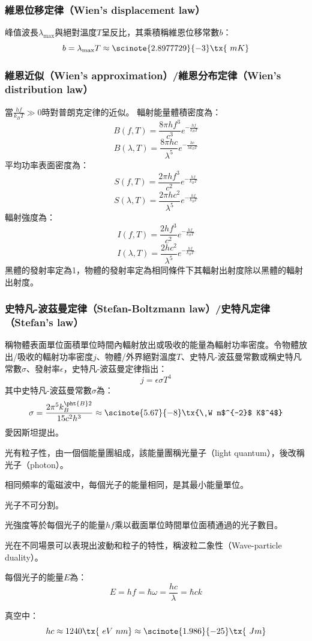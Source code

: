 \documentclass[a4paper,12pt]{article}
\begin{document}
\subsubsection{維恩位移定律（Wien's displacement law）}
峰值波長$\lambda_{\max}$與絕對溫度$T$呈反比，其乘積稱維恩位移常數$b$：
\[b=\lambda_{\max} T \approx \scinote{2.8977729}{-3} \tx{\ m K}\]
\subsubsection{維恩近似（Wien's approximation）/維恩分布定律（Wien's distribution law）}
當$\frac{hf}{k_BT}\gg 0$時對普朗克定律的近似。
輻射能量體積密度為：
\[B(f,T)=\frac{8\pi hf^3}{c^3}e^{-\frac{hf}{k_BT}}\]
\[B(\lambda,T)=\frac{8\pi hc}{\lambda^5}e^{-\frac{hc}{\lambda k_BT}}\]
平均功率表面密度為：
\[S(f,T)=\frac{2\pi hf^3}{c^2}e^{-\frac{hf}{k_BT}}\]
\[S(\lambda,T)=\frac{2\pi hc^2}{\lambda^5}e^{-\frac{hf}{k_BT}}\]
輻射強度為：
\[I(f,T)=\frac{2hf^3}{c^2}e^{-\frac{hf}{k_BT}}\]
\[I(\lambda,T)=\frac{2hc^2}{\lambda^5}e^{-\frac{hf}{k_BT}}\]
黑體的發射率定為1，物體的發射率定為相同條件下其輻射出射度除以黑體的輻射出射度。
\subsubsection{史特凡-波茲曼定律（Stefan-Boltzmann law）/史特凡定律（Stefan's law）}
稱物體表面單位面積單位時間內輻射放出或吸收的能量為輻射功率密度。令物體放出/吸收的輻射功率密度$j$、物體/外界絕對溫度$T$、史特凡-波茲曼常數或稱史特凡常數$\sigma$、發射率$\epsilon$，史特凡-波茲曼定律指出：
\[j=\epsilon\sigma T^4\]
其中史特凡-波茲曼常數$\sigma$為：
\[\sigma=\frac{2\pi^5k_B^{\pht{B}2}}{15c^2h^3}\approx\scinote{5.67}{-8}\tx{\ W m$^{-2}$ K$^4$}\]
愛因斯坦提出。
\bit
\item 光有粒子性，由一個個能量團組成，該能量團稱光量子（light quantum），後改稱光子（photon）。
\item 相同頻率的電磁波中，每個光子的能量相同，是其最小能量單位。
\item 光子不可分割。
\item 光強度等於每個光子的能量$hf$乘以截面單位時間單位面積通過的光子數目。
\item 光在不同場景可以表現出波動和粒子的特性，稱波粒二象性（Wave-particle duality）。
\item 每個光子的能量$E$為：
\[E=hf=\hbar\omega=\frac{hc}{\lambda}=\hbar ck\]
\eit

真空中：
\[hc\approx 1240\tx{\ eV\ nm}\approx\scinote{1.986}{-25}\tx{\ J m}\]
\end{document}
